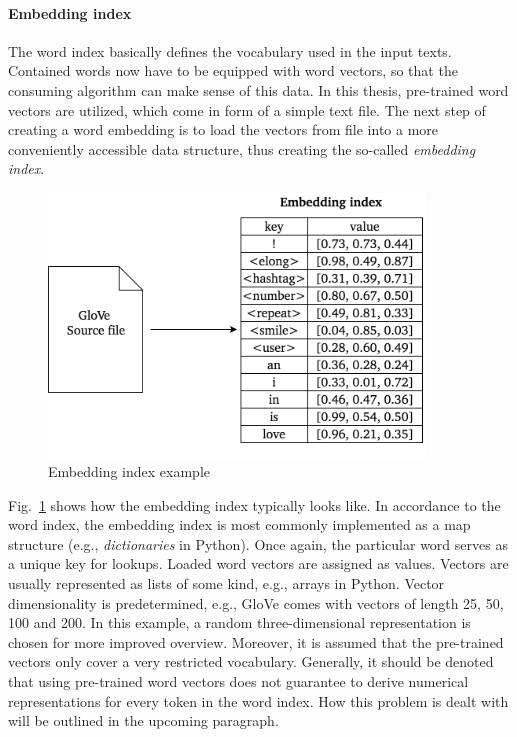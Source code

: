 \paragraph{Embedding index}
\label{sub:embedding_index}

The word index basically defines the vocabulary used in the input texts.
Contained words now have to be equipped with word vectors, so that the
consuming algorithm can make sense of this data.
In this thesis, pre-trained word vectors are utilized, which come in form of a
simple text file.
The next step of creating a word embedding is to load the vectors from file
into a more conveniently accessible data structure, thus creating the so-called
\textit{embedding index}.

\begin{figure}[h]
  \includegraphics[height=7cm]{img/text_preprocessing_4}
  \caption{Embedding index example}
\label{fig:embedding_index}
\end{figure}

Fig.~\ref{fig:embedding_index} shows how the embedding index typically looks
like.
In accordance to the word index, the embedding index is most commonly implemented
as a map structure (e.g., \textit{dictionaries} in Python).
Once again, the particular word serves as a unique key for lookups.
Loaded word vectors are assigned as values.
Vectors are usually represented as lists of some kind, e.g., arrays in Python.
Vector dimensionality is predetermined, e.g., GloVe comes with vectors of length
25, 50, 100 and 200.
In this example, a random three-dimensional representation is chosen for more
improved overview.
Moreover, it is assumed that the pre-trained vectors only cover a very restricted
vocabulary.
Generally, it should be denoted that using pre-trained word vectors does not guarantee
to derive numerical representations for every token in the word index.
How this problem is dealt with will be outlined in the upcoming paragraph.

